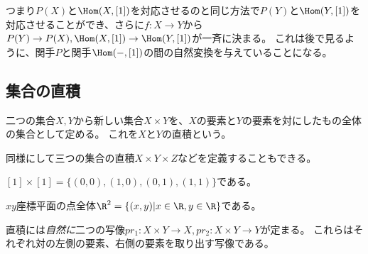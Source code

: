 \documentclass{jsarticle}
\begin{document}
つまり$P(X)$と$\Hom(X,[1])$を対応させるのと同じ方法で$P(Y)$と$\Hom(Y,[1])$を対応させることができ、さらに$f:X \to Y$から$P(Y) \to P(X), \Hom(X,[1]) \to \Hom(Y,[1])$が一斉に決まる。
これは後で見るように、関手$P$と関手$\Hom(-,[1])$の間の自然変換を与えていることになる。

\subsection{集合の直積}

\begin{dfn}[直積]
二つの集合$X, Y$から新しい集合$X \times Y$を、$X$の要素と$Y$の要素を対にしたもの全体の集合として定める。
これを$X$と$Y$の直積という。

同様にして三つの集合の直積$X \times Y \times Z$などを定義することもできる。
\end{dfn}

\begin{eg}
$[1] \times [1]=\{(0,0), (1,0), (0,1), (1,1)\}$である。
\end{eg}

\begin{eg}
$xy$座標平面の点全体$\R^2=\{(x,y)\vert x\in\R, y\in\R\}$である。
\end{eg}

直積には\emph{自然に}二つの写像$pr_1:X \times Y \to X, pr_2:X \times Y \to Y$が定まる。
これらはそれぞれ対の左側の要素、右側の要素を取り出す写像である。
\end{document}
